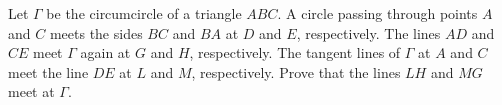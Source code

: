 Let $ \Gamma$ be the circumcircle of a triangle $ ABC$. A circle passing through points $ A$ and $ C$ meets the sides $ BC$ and $ BA$ at $ D$ and $ E$, respectively. The lines $ AD$ and $ CE$ meet $ \Gamma$ again at $ G$ and $ H$, respectively. The tangent lines of $ \Gamma$ at $ A$ and $ C$ meet the line $ DE$ at $ L$ and $ M$, respectively. Prove that the lines $ LH$ and $ MG$ meet at $ \Gamma$.
